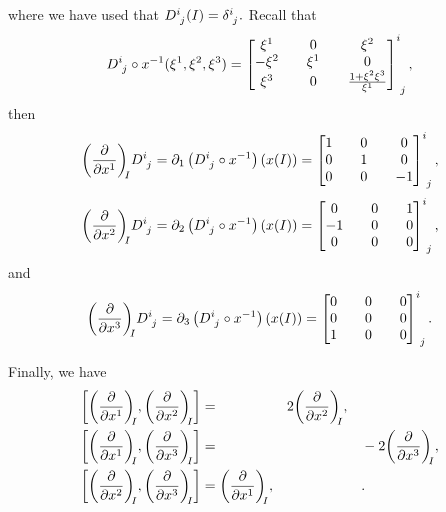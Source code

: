 where we have used that \(D\indices{^i_j}(I) = \delta\indices{^i_j}.\) Recall that
\begin{equation*}
    D\indices{^i_j}\circ x^{-1} (\xi^1,\xi^2,\xi^3) = \begin{bmatrix}
        \xi^1 && 0 && \xi^2\\
        -\xi^2 && \xi^1 && 0\\
        \xi^3 && 0 && \frac{1+\xi^2\xi^3}{\xi^1}
    \end{bmatrix}\indices{^i_j},
\end{equation*}
then
\begin{equation*}
    \bvec{x^1}{I}D\indices{^i_j} = \partial_1\left(D\indices{^i_j}\circ x^{-1}\right)(x(I)) = \begin{bmatrix}
        1 && 0 && 0\\
        0 && 1 && 0\\
        0 && 0 && -1
    \end{bmatrix}\indices{^i_j},
\end{equation*}
\begin{equation*}
    \bvec{x^2}{I}D\indices{^i_j} = \partial_2\left(D\indices{^i_j}\circ x^{-1}\right)(x(I)) = \begin{bmatrix}
        0 && 0 && 1\\
        -1 && 0 && 0\\
        0 && 0 && 0
    \end{bmatrix}\indices{^i_j},
\end{equation*}
and
\begin{equation*}
    \bvec{x^3}{I}D\indices{^i_j} = \partial_3\left(D\indices{^i_j}\circ x^{-1}\right)(x(I)) = \begin{bmatrix}
        0 && 0 && 0\\
        0 && 0 && 0\\
        1 && 0 && 0
    \end{bmatrix}\indices{^i_j}.
\end{equation*}

Finally, we have
\begin{equation*}
    \begin{aligned}
        \left[\bvec{x^1}{I}, \bvec{x^2}{I}\right] &= &&2\bvec{x^2}{I},&&\\
        \left[\bvec{x^1}{I}, \bvec{x^3}{I}\right] &= && &&-2\bvec{x^3}{I},\\
        \left[\bvec{x^2}{I}, \bvec{x^3}{I}\right] &= \bvec{x^1}{I},&&&&.
    \end{aligned}
\end{equation*}


